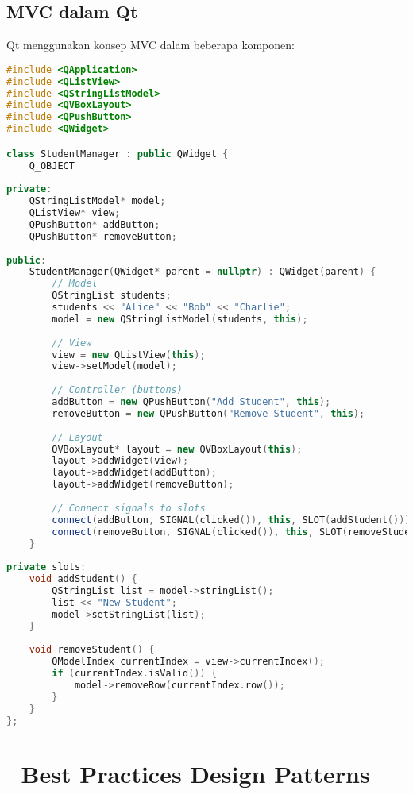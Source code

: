 \subsection{MVC dalam Qt}

Qt menggunakan konsep MVC dalam beberapa komponen:

\begin{lstlisting}[language=c++, caption=Qt MVC Example]
#include <QApplication>
#include <QListView>
#include <QStringListModel>
#include <QVBoxLayout>
#include <QPushButton>
#include <QWidget>

class StudentManager : public QWidget {
    Q_OBJECT
    
private:
    QStringListModel* model;
    QListView* view;
    QPushButton* addButton;
    QPushButton* removeButton;
    
public:
    StudentManager(QWidget* parent = nullptr) : QWidget(parent) {
        // Model
        QStringList students;
        students << "Alice" << "Bob" << "Charlie";
        model = new QStringListModel(students, this);
        
        // View
        view = new QListView(this);
        view->setModel(model);
        
        // Controller (buttons)
        addButton = new QPushButton("Add Student", this);
        removeButton = new QPushButton("Remove Student", this);
        
        // Layout
        QVBoxLayout* layout = new QVBoxLayout(this);
        layout->addWidget(view);
        layout->addWidget(addButton);
        layout->addWidget(removeButton);
        
        // Connect signals to slots
        connect(addButton, SIGNAL(clicked()), this, SLOT(addStudent()));
        connect(removeButton, SIGNAL(clicked()), this, SLOT(removeStudent()));
    }
    
private slots:
    void addStudent() {
        QStringList list = model->stringList();
        list << "New Student";
        model->setStringList(list);
    }
    
    void removeStudent() {
        QModelIndex currentIndex = view->currentIndex();
        if (currentIndex.isValid()) {
            model->removeRow(currentIndex.row());
        }
    }
};
\end{lstlisting}

\section{🎯 Best Practices Design Patterns}

